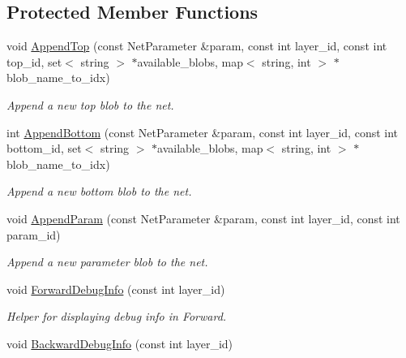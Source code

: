 \subsection*{Protected Member Functions}
\begin{DoxyCompactItemize}
\item 
void \hyperlink{classcaffe_1_1Net_a3aab736bc72b29c84dc3ee765ee453c4}{Append\+Top} (const Net\+Parameter \&param, const int layer\+\_\+id, const int top\+\_\+id, set$<$ string $>$ $\ast$available\+\_\+blobs, map$<$ string, int $>$ $\ast$blob\+\_\+name\+\_\+to\+\_\+idx)\hypertarget{classcaffe_1_1Net_a3aab736bc72b29c84dc3ee765ee453c4}{}\label{classcaffe_1_1Net_a3aab736bc72b29c84dc3ee765ee453c4}

\begin{DoxyCompactList}\small\item\em Append a new top blob to the net. \end{DoxyCompactList}\item 
int \hyperlink{classcaffe_1_1Net_a6ef3482f4e882e437c81affa77d91f32}{Append\+Bottom} (const Net\+Parameter \&param, const int layer\+\_\+id, const int bottom\+\_\+id, set$<$ string $>$ $\ast$available\+\_\+blobs, map$<$ string, int $>$ $\ast$blob\+\_\+name\+\_\+to\+\_\+idx)\hypertarget{classcaffe_1_1Net_a6ef3482f4e882e437c81affa77d91f32}{}\label{classcaffe_1_1Net_a6ef3482f4e882e437c81affa77d91f32}

\begin{DoxyCompactList}\small\item\em Append a new bottom blob to the net. \end{DoxyCompactList}\item 
void \hyperlink{classcaffe_1_1Net_a1fce7e829c10750543f3a79819d49393}{Append\+Param} (const Net\+Parameter \&param, const int layer\+\_\+id, const int param\+\_\+id)\hypertarget{classcaffe_1_1Net_a1fce7e829c10750543f3a79819d49393}{}\label{classcaffe_1_1Net_a1fce7e829c10750543f3a79819d49393}

\begin{DoxyCompactList}\small\item\em Append a new parameter blob to the net. \end{DoxyCompactList}\item 
void \hyperlink{classcaffe_1_1Net_a3751d6095c3d4f4384c52ad80bbd0d88}{Forward\+Debug\+Info} (const int layer\+\_\+id)\hypertarget{classcaffe_1_1Net_a3751d6095c3d4f4384c52ad80bbd0d88}{}\label{classcaffe_1_1Net_a3751d6095c3d4f4384c52ad80bbd0d88}

\begin{DoxyCompactList}\small\item\em Helper for displaying debug info in Forward. \end{DoxyCompactList}\item 
void \hyperlink{classcaffe_1_1Net_a0ddec52928f0488e1b1136a0d72db0a1}{Backward\+Debug\+Info} (const int layer\+\_\+id)\hypertarget{classcaffe_1_1Net_a0ddec52928f0488e1b1136a0d72db0a1}{}\label{classcaffe_1_1Net_a0ddec52928f0488e1b1136a0d72db0a1}


\end{DoxyCompactItemize}
